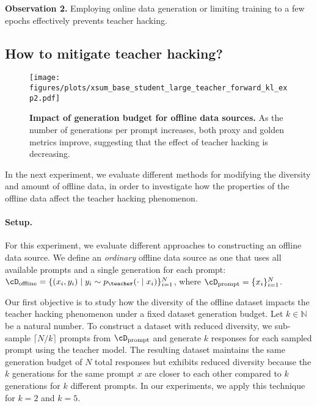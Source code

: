 \begin{tcolorbox}[colback=colorblue,
    colframe=black,
    arc=4pt,
    boxsep=0.3pt,
]%
\textbf{Observation 2.} Employing online data generation or limiting training to a few epochs effectively prevents teacher hacking.
\end{tcolorbox}


\subsection{How to mitigate teacher hacking?}\label{sec:diversity}


\begin{figure*}[ht]
    \centering
    \texttt{[image: figures/plots/xsum\_base\_student\_large\_teacher\_forward\_kl\_exp2.pdf]}
    \caption{\textbf{Impact of generation budget for offline data sources.} 
    As the number of generations per prompt increases, both proxy and golden metrics improve, suggesting that the effect of teacher hacking is decreasing.
    }
    \label{fig:exp_large_to_base_budget_fwd_kl}
\end{figure*}


In the next experiment, we evaluate different methods for modifying the diversity and amount of offline data, in order to investigate how the properties of the offline data affect the teacher hacking phenomenon.

\paragraph{Setup.}

For this experiment, we evaluate different approaches to constructing an offline data source. We define an \textit{ordinary} offline data source as one that uses all available prompts and a single generation for each prompt: $\cD_{\mathrm{offline}} = \{ (x_i, y_i) \mid y_i \sim p_{\teacher}(\cdot \mid x_i) \}_{i=1}^N$, where $\cD_{\mathrm{prompt}} = \{ x_i \}_{i=1}^N$.

Our first objective is to study how the diversity of the offline dataset impacts the teacher hacking phenomenon under a fixed dataset generation budget. Let $k \in \mathbb{N}$ be a natural number. To construct a dataset with reduced diversity, we sub-sample $\lceil N / k \rceil$ prompts from $\cD_{\mathrm{prompt}}$ and generate $k$ responses for each sampled prompt using the teacher model. The resulting dataset maintains the same generation budget of $N$ total responses but exhibits reduced diversity because the $k$ generations for the same prompt $x$ are closer to each other compared to $k$ generations for $k$ different prompts. In our experiments, we apply this technique for $k = 2$ and $k = 5$.

